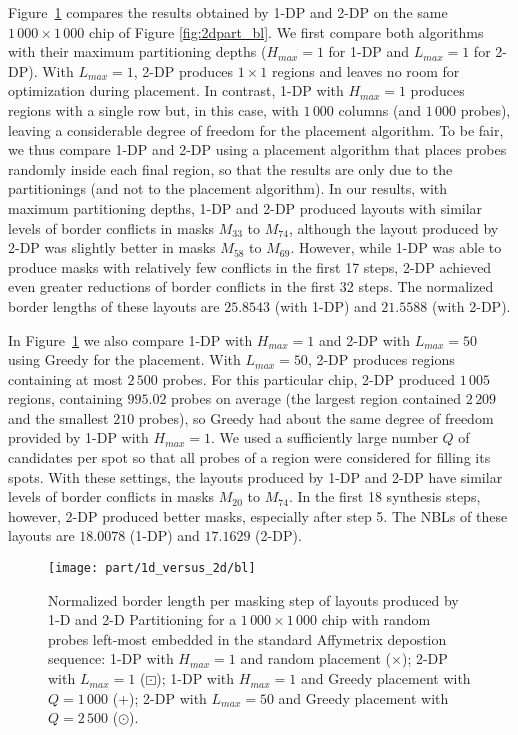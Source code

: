 Figure~\ref{fig:1dp_versus_2dp} compares the results obtained by 1-DP and 2-DP
on the same $1\,000\times 1\,000$ chip of Figure \ref{fig:2dpart_bl}. We first
compare both algorithms with their maximum partitioning depths ($H_{max}=1$ for
1-DP and $L_{max}=1$ for 2-DP). With $L_{max}=1$, 2-DP produces $1\times 1$
regions and leaves no room for optimization during placement. In contrast, 1-DP
with $H_{max}=1$ produces regions with a single row but, in this case, with
$1\,000$ columns (and $1\,000$ probes), leaving a considerable degree of
freedom for the placement algorithm. To be fair, we thus compare 1-DP and
2-DP using a placement algorithm that places probes randomly inside each final
region, so that the results are only due to the partitionings (and not to the
placement algorithm). In our results, with maximum partitioning depths, 1-DP and
2-DP produced layouts with similar levels of border conflicts in masks
$M_{33}$ to $M_{74}$, although the layout produced by 2-DP was slightly better
in masks $M_{58}$ to $M_{69}$. However, while 1-DP was able to produce masks
with relatively few conflicts in the first 17 steps, 2-DP achieved even greater
reductions of border conflicts in the first 32 steps. The normalized border
lengths of these layouts are $25.8543$ (with 1-DP) and $21.5588$ (with 2-DP).

In Figure~\ref{fig:1dp_versus_2dp} we also compare 1-DP with $H_{max}=1$ and
2-DP with $L_{max}=50$ using Greedy for the placement. With $L_{max}=50$, 2-DP
produces regions containing at most $2\,500$ probes. For this particular chip,
2-DP produced $1\,005$ regions, containing $995.02$ probes on average (the
largest region contained $2\,209$ and the smallest $210$ probes), so Greedy had
about the same degree of freedom provided by 1-DP with $H_{max}=1$. We used a
sufficiently large number $Q$ of candidates per spot so that all probes of a
region were considered for filling its spots. With these settings, the layouts
produced by 1-DP and 2-DP have similar levels of border conflicts in masks
$M_{20}$ to $M_{74}$. In the first 18 synthesis steps, however, 2-DP produced
better masks, especially after step 5. The NBLs of these layouts are $18.0078$
(1-DP) and $17.1629$ (2-DP).

\begin{figure}[t]\centering
\texttt{[image: part/1d\_versus\_2d/bl]}
\caption{\label{fig:1dp_versus_2dp}
  Normalized border length per masking step of layouts produced by 1-D and 2-D
  Partitioning for a $1\,000\times 1\,000$ chip with random probes left-most
  embedded in the standard Affymetrix depostion sequence: 1-DP with $H_{max}=1$
  and random placement ({\scriptsize $\times$}); 2-DP with $L_{max}=1$
  ({\tiny $\boxdot$}); 1-DP with $H_{max}=1$ and Greedy placement with
  $Q=1\,000$ ({\tiny $+$}); 2-DP with $L_{max}=50$ and Greedy placement with
  $Q=2\,500$ ({\tiny $\odot$}).}
\end{figure}

